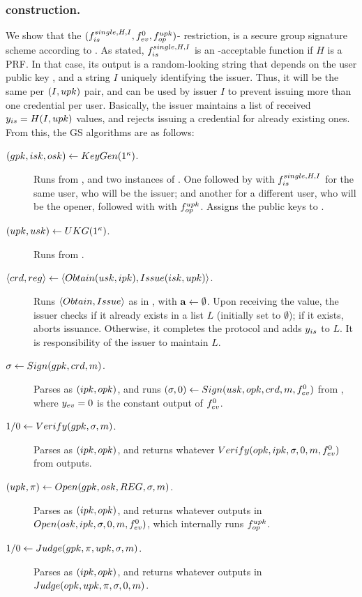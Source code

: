 \subsubsection{\CUASGS construction.} %
We show that the $(f_{is}^{single,H,I},f_{ev}^0,f_{op}^{upk})$-\CUASGen
restriction, is a secure group signature scheme according to \cite{bsz05}.
As stated, $f_{is}^{single,H,I}$ is an \UAS-acceptable function if $H$ is a
PRF. In that case, its output is a random-looking string that depends on the
user public key \upk, and a string $I$ uniquely identifying the issuer. Thus, it
will be the same per $(I,upk)$ pair, and can be used by issuer $I$ to prevent
issuing more than one credential per user. Basically, the issuer maintains a
list of received $y_{is} = H(I,upk)$ values, and rejects issuing a credential
for already existing ones. From this, the GS algorithms are as
follows:

\begin{description}
\item[$(gpk,isk,osk) \gets KeyGen(1^\kappa)$.] Runs \Setup from \CUASGen,
  and two instances of \KeyGen. One followed by \ISet with $f_{is}^{single,H,
    I}$ for the same user, who will be the issuer; and another for a different
  user, who will be the opener, followed with \OKeyGen with $f_{op}^{upk}$.
  Assigns the public keys to \gpk.
\item[$(upk,usk) \gets UKG(1^\kappa)$.] Runs \KeyGen from \CUASGen.
\item[$\langle crd,reg \rangle \gets
  \langle Obtain(usk,ipk),Issue(isk,upk)\rangle$.] Runs $\langle Obtain,
  Issue\rangle$ as in \CUASGen, with $\mathbf{a} \gets \emptyset$. Upon receiving
  the \yissue value, the issuer checks if it already exists in a list $L$
  (initially set to $\emptyset$); if it exists, aborts issuance. Otherwise, it
  completes the protocol and adds $y_{is}$ to $L$. It is responsibility of the
  issuer to maintain $L$.
\item[$\sigma \gets Sign(gpk,crd,m)$.] Parses \gpk as $(ipk,opk)$, and
  runs $(\sigma,0) \gets Sign(usk,opk,crd,m,f_{ev}^0)$ from \CUASGen,
  where $y_{ev} = 0$ is the constant output of $f_{ev}^0$.
\item[$1/0 \gets Verify(gpk,\sigma,m)$.] Parses \gpk as $(ipk,opk)$, and
  returns whatever $Verify(opk,ipk,\sigma,0,m,f_{ev}^0)$ from \CUASGen
  outputs.
\item[$(\upk,\pi) \gets \Open(\gpk,\osk,\trans,\sig,\msg)$.] Parses \gpk as
  $(ipk,opk)$, and returns whatever \CUASGen outputs in $Open(osk,ipk,\sigma,
  0,m,f_{ev}^0)$, which internally runs $f_{op}^{upk}$.
\item[$1/0 \gets Judge(gpk,\pi,upk,\sigma,m)$.] Parses \gpk as $(ipk,
  opk)$, and returns whatever \CUASGen outputs in $Judge(opk,upk,\pi,\sigma,
  0,m)$.
\end{description}

